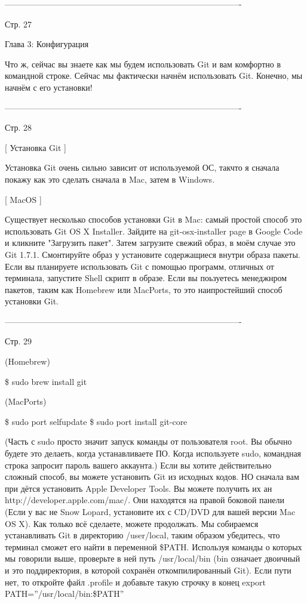 -------------------------------------------------------------------------------------

Стр. 27

Глава 3: Конфигурация

Что ж, сейчас вы знаете как мы будем использовать Git и вам комфортно в командной
строке. Сейчас мы фактически начнём использовать Git. Конечно, мы начнём с его
установки!

-------------------------------------------------------------------------------------

Стр. 28

[ Установка Git ]

Установка Git очень сильно зависит от используемой ОС, такчто я сначала покажу как
это сделать сначала в Mac, затем в Windows.

[ MacOS ]

Существует несколько способов установки Git в Mac: самый простой способ это 
использовать Git OS X Installer. Зайдите на git-osx-installer page в Google Code и 
кликните "Загрузить пакет". Затем загрузите свежий образ, в моём случае это Git 1.7.1.
Смонтируйте образ у установите содержащиеся внутри образа пакеты. Если вы планируете
использовать Git с помощью программ, отличных от терминала, запустите Shell скрипт
в образе.
Если вы поьзуетесь менеджнром пакетов, таким как Homebrew или MacPorts, то это
наипростейший способ установки Git.

-------------------------------------------------------------------------------------

Стр. 29

(Homebrew)

\$ sudo brew install git

(MacPorts)

\$ sudo port selfupdate
\$ sudo port install git-core

(Часть с sudo просто значит запуск команды от пользователя root. Вы обычно будете это
делаеть, когда устанавливаете ПО. Когда используете sudo, командная строка запросит
пароль вашего аккаунта.)
Если вы хотите действительно сложный способ, вы можете установить Git из исходных
кодов. НО сначала вам при дётся установить Apple Developer Tools. Вы можете получить
их ан http://developer.apple.com/mac/. Они находятся на правой боковой панели (Если
у вас не Snow Lopard, установите их с CD/DVD для вашей версии Mac OS X). Как только
всё сделаете, можете продолжать.
Мы собираемся устанавливать Git в директорию /user/local, таким образом убедитесь, 
что терминал сможет его найти в переменной \$PATH. Используя команды о которых 
мы говорили выше, проверьте в ней путь /usr/local/bin (bin означает двоичный и это 
поддиректория, в которой сохранён откомпилированный Git). Если пути нет, то
откройте файл .profile и добавьте такую строчку в конец
export PATH=”/usr/local/bin:\$PATH”

